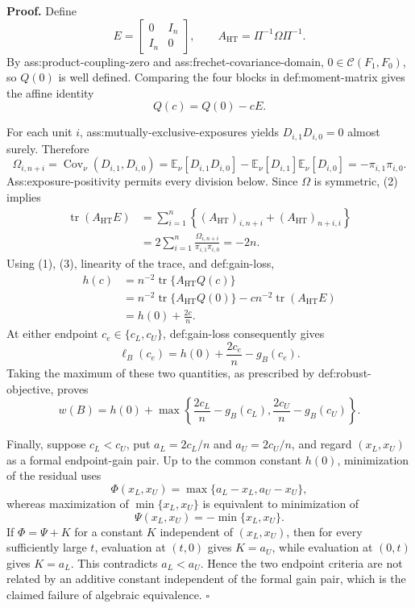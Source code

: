 \textbf{Proof.}
Define
\[
E=\begin{bmatrix}0&I_n\\ I_n&0\end{bmatrix},
\qquad
A_{\mathrm{HT}}=\Pi^{-1}\Omega\Pi^{-1}.
\]
By ass:product-coupling-zero and ass:frechet-covariance-domain, \(0\in\mathcal C(F_1,F_0)\), so \(Q(0)\) is well defined.  Comparing the four blocks in def:moment-matrix gives the affine identity
\[
Q(c)=Q(0)-cE. \tag{1}
\]

For each unit \(i\), ass:mutually-exclusive-exposures yields \(D_{i,1}D_{i,0}=0\) almost surely.  Therefore
\[
\Omega_{i,n+i}
=\operatorname{Cov}_\nu(D_{i,1},D_{i,0})
=\mathbb E_\nu[D_{i,1}D_{i,0}]
 -\mathbb E_\nu[D_{i,1}]\mathbb E_\nu[D_{i,0}]
=-\pi_{i,1}\pi_{i,0}. \tag{2}
\]
Ass:exposure-positivity permits every division below.  Since \(\Omega\) is symmetric, (2) implies
\[
\begin{aligned}
\operatorname{tr}(A_{\mathrm{HT}}E)
&=\sum_{i=1}^n
\left\{(A_{\mathrm{HT}})_{i,n+i}
       +(A_{\mathrm{HT}})_{n+i,i}\right\}\\
&=2\sum_{i=1}^n
\frac{\Omega_{i,n+i}}{\pi_{i,1}\pi_{i,0}}
=-2n. \tag{3}
\end{aligned}
\]
Using (1), (3), linearity of the trace, and def:gain-loss,
\[
\begin{aligned}
h(c)
&=n^{-2}\operatorname{tr}\{A_{\mathrm{HT}}Q(c)\}\\
&=n^{-2}\operatorname{tr}\{A_{\mathrm{HT}}Q(0)\}
  -cn^{-2}\operatorname{tr}(A_{\mathrm{HT}}E)\\
&=h(0)+\frac{2c}{n}.
\end{aligned}
\]
At either endpoint \(c_e\in\{c_L,c_U\}\), def:gain-loss consequently gives
\[
\ell_B(c_e)=h(0)+\frac{2c_e}{n}-g_B(c_e).
\]
Taking the maximum of these two quantities, as prescribed by def:robust-objective, proves
\[
w(B)=h(0)+\max\left\{
\frac{2c_L}{n}-g_B(c_L),
\frac{2c_U}{n}-g_B(c_U)
\right\}.
\]

Finally, suppose \(c_L<c_U\), put \(a_L=2c_L/n\) and \(a_U=2c_U/n\), and regard \((x_L,x_U)\) as a formal endpoint-gain pair.  Up to the common constant \(h(0)\), minimization of the residual uses
\[
\Phi(x_L,x_U)=\max\{a_L-x_L,a_U-x_U\},
\]
whereas maximization of \(\min\{x_L,x_U\}\) is equivalent to minimization of
\[
\Psi(x_L,x_U)=-\min\{x_L,x_U\}.
\]
If \(\Phi=\Psi+K\) for a constant \(K\) independent of \((x_L,x_U)\), then for every sufficiently large \(t\), evaluation at \((t,0)\) gives \(K=a_U\), while evaluation at \((0,t)\) gives \(K=a_L\).  This contradicts \(a_L<a_U\).  Hence the two endpoint criteria are not related by an additive constant independent of the formal gain pair, which is the claimed failure of algebraic equivalence. \(\square\)